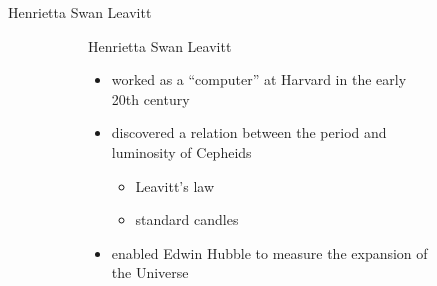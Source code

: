 \documentclass{beamer}
\begin{document}
\begin{frame}{Henrietta Swan Leavitt}
  \begin{figure}[h]
    \centering
    \begin{subfigure}[c]{0.3\textwidth}
      \centering
      \caption*{Henrietta Swan Leavitt}
    \end{subfigure}
    \begin{subfigure}[c]{0.65\textwidth}
      \begin{itemize}
      \item worked as a ``computer'' at Harvard in the early 20th century
      \item discovered a relation between the period and luminosity
        of Cepheids
        \begin{itemize}
        \item Leavitt's law
        \item standard candles
        \end{itemize}
      \item enabled Edwin Hubble to measure the expansion of the Universe
      \end{itemize}
    \end{subfigure}
  \end{figure}
\end{frame}
\end{document}
